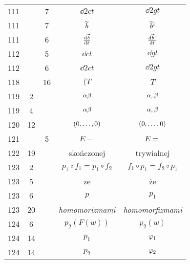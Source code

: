 \documentclass[a4paper,11pt]{article}
\begin{document}
\begin{center}
\begin{tabular}{|c|c|c|c|c|}
    111 & &  7 & $\dd{ 2 }{ c }{ t }$ & $\dd{ 2 }{ g }{ t }$ \\
    111 & &  7 & $\widetilde{ b }$ & $\widetilde{ b }^{ i }$ \\
    111 & &  6 & $\frac{ \mathrm{d}^{  } {  \widetilde{ b }  } }{ \mathrm{d} {  t  }^{  } }$
           & $\frac{ \mathrm{d}^{  } {  \widetilde{ b }^{ i }  } }{ \mathrm{d} {  t  }^{  } }$ \\
    112 & &  5 & $\dd{}{ c }{ t }$ & $\dd{}{ g }{ t }$ \\
    112 & &  6 & $\dd{ 2 }{ c }{ t }$ & $\dd{ 2 }{ g }{ t }$ \\
    118 & & 16 & $(T$ & $T$ \\
    119 &  2 & & $\alpha\beta$ & $\alpha, \beta$ \\
    119 &  4 & & $\alpha\beta$ & $\alpha, \beta$ \\
    120 & 12 & & $( 0. \ldots, 0 )$ & $( 0, \ldots, 0 )$ \\
    121 & &  5 & $E -$ & $E =$ \\
    122 & 19 & & skończonej & trywialnej \\
    123 &  2 & & $p_{ 1 } \circ f_{ 1 } = p_{ 1 } \circ f_{ 2 }$
           & $f_{ 1 } \circ p_{ 1 } = f_{ 2 } \circ p_{ 1 }$ \\
    123 &  5 & & ze & że \\
    123 &  6 & & $p$ & $p_{ 1 }$ \\
    123 & 20 & & \emph{homomorizmami} & \emph{homomorfizmami} \\
    124 &  6 & & $p_{ 2 }( F( w ) )$ & $p_{ 2 }( w )$ \\
    124 & 14 & & $p_{ 1 }$ & $\varphi_{ 1 }$ \\
    124 & 14 & & $p_{ 2 }$ & $\varphi_{ 2 }$ \\
    \hline
  \end{tabular}



\end{center}
\end{document}

